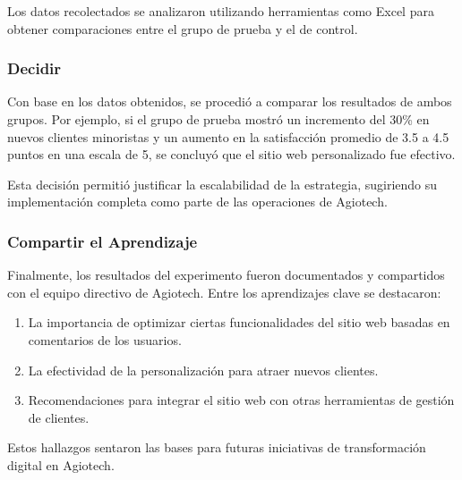 Los datos recolectados se analizaron utilizando herramientas como Excel para obtener
comparaciones entre el grupo de prueba y el de control.

\subsubsection{Decidir}

Con base en los datos obtenidos, se procedió a comparar los resultados de ambos grupos.
Por ejemplo, si el grupo de prueba mostró un incremento del 30\% en nuevos
clientes minoristas y un aumento en la satisfacción promedio de 3.5 a 4.5 puntos
en una escala de 5, se concluyó que el sitio web personalizado fue efectivo.

Esta decisión permitió justificar la escalabilidad de la estrategia, sugiriendo
su implementación completa como parte de las operaciones de Agiotech.

\subsubsection{Compartir el Aprendizaje}

Finalmente, los resultados del experimento fueron documentados y compartidos con
el equipo directivo de Agiotech. Entre los aprendizajes clave se destacaron:

\begin{enumerate}
	\item La importancia de optimizar ciertas funcionalidades del sitio web basadas
	      en comentarios de los usuarios.

	\item La efectividad de la personalización para atraer nuevos clientes.

	\item Recomendaciones para integrar el sitio web con otras herramientas de gestión
	      de clientes.
\end{enumerate}

Estos hallazgos sentaron las bases para futuras iniciativas de transformación
digital en Agiotech.


\nocite{*} %

\clearpage




